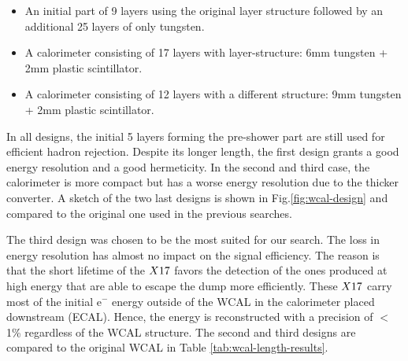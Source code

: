 \begin{itemize}
\item An initial part of 9 layers using the original layer structure followed by an additional 25 layers of only tungsten.
\item A calorimeter consisting of 17 layers with layer-structure: 6mm tungsten + 2mm plastic scintillator.
\item A calorimeter consisting of 12 layers with a different structure: 9mm tungsten + 2mm plastic scintillator.
\end{itemize}

In all designs, the initial 5 layers forming the pre-shower part are still used for efficient hadron rejection. Despite its longer length, the first design grants a good energy resolution and a good hermeticity. In the second and third case, the calorimeter is more compact but has a worse energy resolution due to the thicker converter. A sketch of the two last designs is shown in Fig.\ref{fig:wcal-design} and compared to the original one used in the previous searches.

The third design was chosen to be the most suited for our search. The loss in energy resolution has almost no impact on the signal efficiency. The reason is that the short lifetime of the $X17$ favors the detection of the ones produced at high energy that are able to escape the dump more efficiently. These $X17$ carry most of the initial e$^-$ energy outside of the WCAL in the calorimeter placed downstream (ECAL). Hence, the energy is reconstructed with a precision of $<$1\% regardless of the WCAL structure. The second and third designs are compared to the original WCAL in Table \ref{tab:wcal-length-results}.


